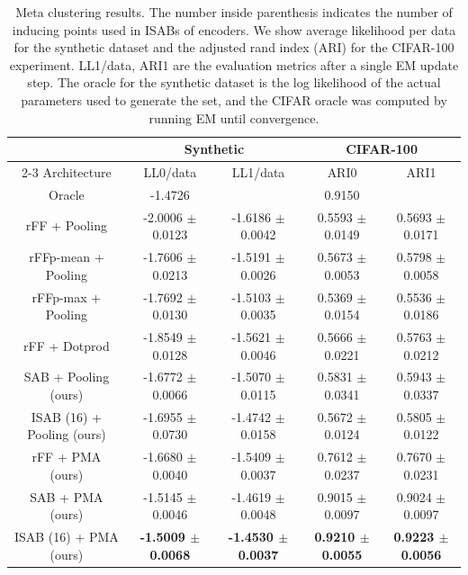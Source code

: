 \begin{table}[h]
	\centering
	\small
	\caption{Meta clustering results.
	The number inside parenthesis indicates the number of inducing points used in ISABs of encoders.
	We show average likelihood per data for the synthetic dataset and the adjusted rand index (ARI) for the CIFAR-100 experiment.
	LL1/data, ARI1 are the evaluation metrics after a single EM update step.
	The oracle for the synthetic dataset is the log likelihood of the actual parameters used to generate the set, and the CIFAR oracle was computed by running EM until convergence.
	}
	\vspace{5pt}
	\begin{tabular}{@{}ccccc@{}}\toprule
		& \multicolumn{2}{c}{Synthetic} & \multicolumn{2}{c}{CIFAR-100} \\
		\cmidrule{2-3}
		\cmidrule{4-5}
	Architecture & LL0/data & LL1/data & ARI0 & ARI1  \\
	\midrule
	Oracle & -1.4726 & & 0.9150 &\\
	rFF + Pooling & -2.0006 $\pm$ 0.0123 &-1.6186 $\pm$ 0.0042 & 0.5593 $\pm$ 0.0149 & 0.5693 $\pm$ 0.0171 \\
	rFFp-mean + Pooling & -1.7606 $\pm$ 0.0213 &-1.5191 $\pm$ 0.0026 & 0.5673 $\pm$ 0.0053 &0.5798 $\pm$ 0.0058 \\
	rFFp-max + Pooling & -1.7692 $\pm$ 0.0130 &-1.5103 $\pm$ 0.0035 & 0.5369 $\pm$ 0.0154 &0.5536 $\pm$ 0.0186 \\
	rFF + Dotprod & -1.8549 $\pm$ 0.0128 &-1.5621 $\pm$ 0.0046 & 0.5666 $\pm$ 0.0221 &0.5763 $\pm$ 0.0212 \\
    \midrule
	SAB + Pooling (ours) & -1.6772 $\pm$ 0.0066 &-1.5070 $\pm$ 0.0115 & 0.5831 $\pm$ 0.0341 &0.5943 $\pm$ 0.0337\\
	ISAB (16) + Pooling (ours) & -1.6955 $\pm$ 0.0730 &-1.4742 $\pm$ 0.0158 & 0.5672 $\pm$ 0.0124 &0.5805 $\pm$ 0.0122\\
	rFF + PMA (ours) & -1.6680 $\pm$ 0.0040 &-1.5409 $\pm$ 0.0037 &  0.7612 $\pm$ 0.0237 &0.7670 $\pm$ 0.0231\\
	SAB + PMA (ours) & -1.5145 $\pm$ 0.0046 &-1.4619 $\pm$ 0.0048 &  0.9015 $\pm$ 0.0097 &0.9024 $\pm$ 0.0097\\
	ISAB (16) + PMA (ours) & \bf -1.5009 $\pm$ 0.0068 & \bf -1.4530 $\pm$ 0.0037 & \bf 0.9210 $\pm$ 0.0055 &\bf 0.9223 $\pm$ 0.0056 \\
	\bottomrule
	\end{tabular}
	\label{tab:meta_clustering}
\end{table}

